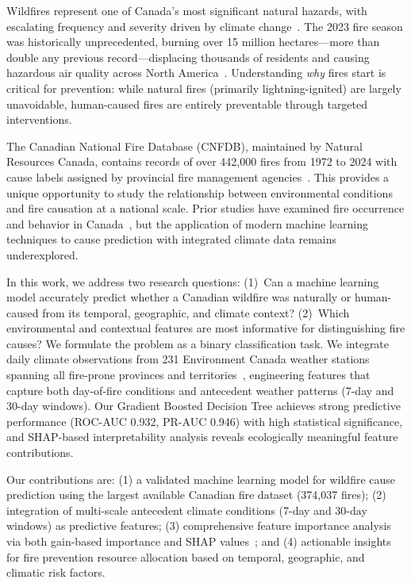 \documentclass[sigconf,nonacm]{acmart}
\begin{document}
Wildfires represent one of Canada's most significant natural hazards, with escalating frequency and severity driven by climate change~\cite{flannigan2009}. The 2023 fire season was historically unprecedented, burning over 15 million hectares---more than double any previous record---displacing thousands of residents and causing hazardous air quality across North America~\cite{nrcan2023wildfire}. Understanding \textit{why} fires start is critical for prevention: while natural fires (primarily lightning-ignited) are largely unavoidable, human-caused fires are entirely preventable through targeted interventions.

The Canadian National Fire Database (CNFDB), maintained by Natural Resources Canada, contains records of over 442,000 fires from 1972 to 2024 with cause labels assigned by provincial fire management agencies~\cite{cwfis2025}. This provides a unique opportunity to study the relationship between environmental conditions and fire causation at a national scale. Prior studies have examined fire occurrence and behavior in Canada~\cite{stocks2002, wotton2003}, but the application of modern machine learning techniques to cause prediction with integrated climate data remains underexplored.

In this work, we address two research questions: (1)~Can a machine learning model accurately predict whether a Canadian wildfire was naturally or human-caused from its temporal, geographic, and climate context? (2)~Which environmental and contextual features are most informative for distinguishing fire causes? We formulate the problem as a binary classification task. We integrate daily climate observations from 231 Environment Canada weather stations spanning all fire-prone provinces and territories~\cite{eccc2025}, engineering features that capture both day-of-fire conditions and antecedent weather patterns (7-day and 30-day windows). Our Gradient Boosted Decision Tree achieves strong predictive performance (ROC-AUC 0.932, PR-AUC 0.946) with high statistical significance, and SHAP-based interpretability analysis reveals ecologically meaningful feature contributions.

Our contributions are: (1) a validated machine learning model for wildfire cause prediction using the largest available Canadian fire dataset (374,037 fires); (2) integration of multi-scale antecedent climate conditions (7-day and 30-day windows) as predictive features; (3) comprehensive feature importance analysis via both gain-based importance and SHAP values~\cite{lundberg2017}; and (4) actionable insights for fire prevention resource allocation based on temporal, geographic, and climatic risk factors.
\end{document}
